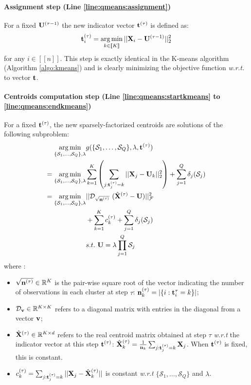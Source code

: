 \paragraph{Assignment step (Line \ref{line:qmeans:assignment})} For a fixed ${\mathbf{U}}^{(\tau-1)}$ the new indicator vector ${\mathbf{t}}^{(\tau)}$ is defined as:
%
\begin{equation}
\label{eq:qmean_problem_U_fixed}
 {\mathbf{t}}^{(\tau)}_i = \operatorname*{arg\,min}_{k \in [\![K]\!]} ||{\mathbf{X}}_i - {\mathbf{U}}^{(\tau-1)}||_2^2
\end{equation}
%
for any $i \in [\![n]\!]$. This step is exactly identical in the K-means algorithm (Algorithm \ref{algo:kmeans}) and is clearly minimizing the objective function \textit{w.r.t.} to vector ${\mathbf{t}}$.

\paragraph{Centroids computation step (Line \ref{line:qmeans:startkmeans} to \ref{line:qmeans:endkmeans})} For a fixed ${\mathbf{t}}^{(\tau)}$, the new sparsely-factorized centroids are solutions of the following subproblem:
%
\begin{equation}
\label{eq:qmeans_problem_t_fixed}
\begin{split}
 \operatorname*{arg\,min}_{\{ \mathcal{S}_1, \ldots,\mathcal{S}_Q\}, \lambda} & g(\{ \mathcal{S}_1, \ldots,\mathcal{S}_Q\}, \lambda, {\mathbf{t}}^{(\tau)}) \\
 = \operatorname*{arg\,min}_{\{ \mathcal{S}_1, \ldots,\mathcal{S}_Q\}, \lambda} &\sum_{k=1}^{K} \left( \sum_{j: {\mathbf{t}}^{(\tau)}_j = k} ||{\mathbf{X}}_j - {\mathbf{U}}_k||^2_2 \right) + \sum_{j=1}^{Q} \delta_j(\mathcal{S}_j)  \\
 = \operatorname*{arg\,min}_{\{ \mathcal{S}_1, \ldots,\mathcal{S}_Q\}, \lambda} & ||\mathcal{D}_{\sqrt{{\mathbf{n}}^{(\tau)}}}~(\hat{{\mathbf{X}}}^{(\tau)} - {\mathbf{U}})||_{\mathcal{F}} ^ 2  \\
 &+ \sum_{k=1}^{K} c_k^{(\tau)} + \sum_{j=1}^{Q} \delta_j(\mathcal{S}_j)\\
 & s.t. ~ {\mathbf{U}} = \lambda \prod_{j=1}^{Q}{\mathcal{S}_j}
\end{split} 
\end{equation}
%
where :
%
\begin{itemize}
 \item $\sqrt{{\mathbf{n}}^{(\tau)}} \in {\mathbb{R}^{K}}$ is the pair-wise square root of the vector indicating the number of observations in each cluster at step $\tau$: ${\mathbf{n}}_k^{(\tau)} = |\{i: {\mathbf{t}}^\tau_i = k\}|$;
 \item $\mathcal{D}_{\mathbf{v}} \in \mathbb{R}^{K \times K}$ refers to a diagonal matrix with entries in the diagonal from a vector ${\mathbf{v}}$;
 \item $\hat{{\mathbf{X}}}^{(\tau)} \in \mathbb{R}^{K \times d}$ refers to the real centroid matrix obtained at step $\tau$ \textit{w.r.t} the indicator vector at this step ${\mathbf{t}}^{(\tau)}$: $\hat{{\mathbf{X}}}^{(\tau)}_k = \frac{1}{{\mathbf{n}}_k}\sum_{j:{\mathbf{t}}^{(\tau)}_j = k} {{\mathbf{X}}_j}$. When ${\mathbf{t}}^{(\tau)}$ is fixed, this is constant.
 \item $c_k^{(\tau)} = \sum_{j: {\mathbf{t}}^{(\tau)}_j = k}^{}||{\mathbf{X}}_j - \hat{{\mathbf{X}}}_k^{(\tau)}||$ is constant \textit{w.r.t} $\{ \mathcal{S}_1, \ldots,\mathcal{S}_Q\}$ and $\lambda$.
\end{itemize}


